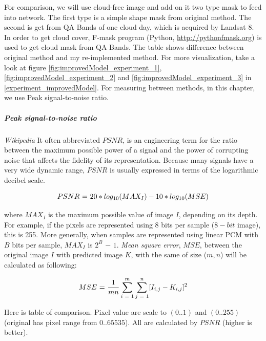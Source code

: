 For comparison, we will use cloud-free image and add on it two type mask to feed into network. The first type is a simple shape mask from original method. The second is get from QA Bands of one cloud day, which is acquired by Landsat 8. In order to get cloud cover, F-mask program (Python, \href{http://pythonfmask.org}{http://pythonfmask.org}) is used to get cloud mask from QA Bands. The table shows difference between original method and my re-implemented method. For more visualization, take a look at figure \ref{fig:improvedModel_experiment_1}, \ref{fig:improvedModel_experiment_2} and \ref{fig:improvedModel_experiment_3} in \ref{experiment_improvedModel}. For measuring between methods, in this chapter, we use Peak signal-to-noise ratio.

\subparagraph{Peak signal-to-noise ratio} \textit{Wikipedia} It often abbreviated $PSNR$, is an engineering term for the ratio between the maximum possible power of a signal and the power of corrupting noise that affects the fidelity of its representation. Because many signals have a very wide dynamic range, $PSNR$ is usually expressed in terms of the logarithmic decibel scale. 

\begin{equation}
\label{psnr_eq}
\centering
PSNR \textrm{ = } 20 * log_{10}(MAX_I) - 10 * log_{10}(MSE)
\end{equation}

where $MAX_I$ is the maximum possible value of image $I$, depending on its depth. For example, if the pixels are represented using 8 bits per sample ($8-bit$ image), this is 255. More generally, when samples are represented using linear PCM with $B$ bits per sample, $MAX_I$ is $2^B$ $-$ $1$. \textit{Mean square error}, $MSE$, between the original image $I$ with predicted image $K$, with the same of size ($m, n$) will be calculated as following:

\begin{equation}
\centering
MSE \textrm{ = } \frac{1}{mn} \sum_{i \textrm{ = } 1}^{m} \sum_{j \textrm{ = } 1}^{n} [I_{i,j} - K_{i,j}]^2
\end{equation}

\vspace{0.3cm}
Here is table of comparison. Pixel value are scale to $(0..1)$ and $(0..255)$ (original has pixel range from $0..65535$). All are calculated by $PSNR$ (higher is better).

